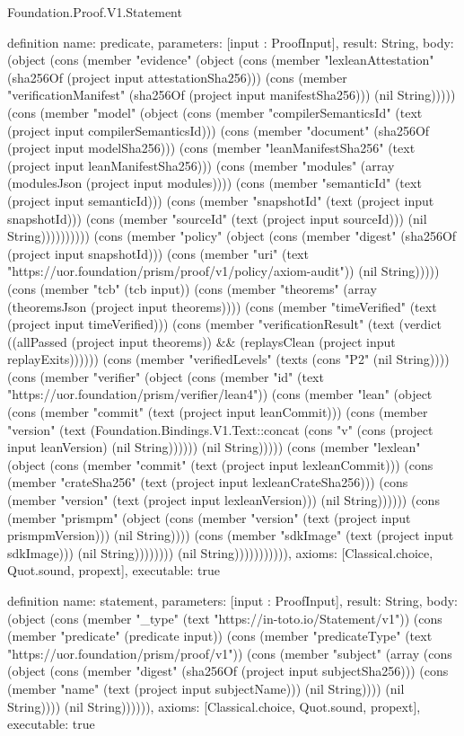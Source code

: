 \begin{lexlean}{Foundation.Proof.V1.Statement}
\begin{semanticmodule}
definition{
  name: predicate,
  parameters: [input : ProofInput],
  result: String,
  body: (object (cons (member "evidence" (object (cons (member "lexleanAttestation" (sha256Of (project input attestationSha256))) (cons (member "verificationManifest" (sha256Of (project input manifestSha256))) (nil String))))) (cons (member "model" (object (cons (member "compilerSemanticsId" (text (project input compilerSemanticsId))) (cons (member "document" (sha256Of (project input modelSha256))) (cons (member "leanManifestSha256" (text (project input leanManifestSha256))) (cons (member "modules" (array (modulesJson (project input modules)))) (cons (member "semanticId" (text (project input semanticId))) (cons (member "snapshotId" (text (project input snapshotId))) (cons (member "sourceId" (text (project input sourceId))) (nil String)))))))))) (cons (member "policy" (object (cons (member "digest" (sha256Of (project input snapshotId))) (cons (member "uri" (text "https://uor.foundation/prism/proof/v1/policy/axiom-audit")) (nil String))))) (cons (member "tcb" (tcb input)) (cons (member "theorems" (array (theoremsJson (project input theorems)))) (cons (member "timeVerified" (text (project input timeVerified))) (cons (member "verificationResult" (text (verdict ((allPassed (project input theorems)) && (replaysClean (project input replayExits)))))) (cons (member "verifiedLevels" (texts (cons "P2" (nil String)))) (cons (member "verifier" (object (cons (member "id" (text "https://uor.foundation/prism/verifier/lean4")) (cons (member "lean" (object (cons (member "commit" (text (project input leanCommit))) (cons (member "version" (text (Foundation.Bindings.V1.Text::concat (cons "v" (cons (project input leanVersion) (nil String)))))) (nil String))))) (cons (member "lexlean" (object (cons (member "commit" (text (project input lexleanCommit))) (cons (member "crateSha256" (text (project input lexleanCrateSha256))) (cons (member "version" (text (project input lexleanVersion))) (nil String)))))) (cons (member "prismpm" (object (cons (member "version" (text (project input prismpmVersion))) (nil String)))) (cons (member "sdkImage" (text (project input sdkImage))) (nil String)))))))) (nil String))))))))))),
  axioms: [Classical.choice, Quot.sound, propext],
  executable: true
}

definition{
  name: statement,
  parameters: [input : ProofInput],
  result: String,
  body: (object (cons (member "_type" (text "https://in-toto.io/Statement/v1")) (cons (member "predicate" (predicate input)) (cons (member "predicateType" (text "https://uor.foundation/prism/proof/v1")) (cons (member "subject" (array (cons (object (cons (member "digest" (sha256Of (project input subjectSha256))) (cons (member "name" (text (project input subjectName))) (nil String)))) (nil String)))) (nil String)))))),
  axioms: [Classical.choice, Quot.sound, propext],
  executable: true
}


\end{semanticmodule}
\end{lexlean}
